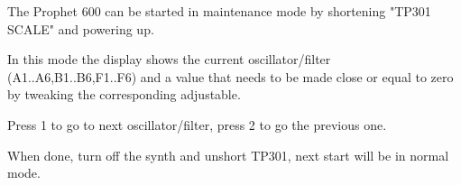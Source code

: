 The Prophet 600 can be started in maintenance mode by shortening "TP301 SCALE" and powering up. 

In this mode the display shows the current oscillator/filter (A1..A6,B1..B6,F1..F6) and a value that needs to be made close or equal to zero by tweaking the corresponding adjustable.

Press 1 to go to next oscillator/filter, press 2 to go the previous one.

When done, turn off the synth and unshort TP301, next start will be in normal mode.
